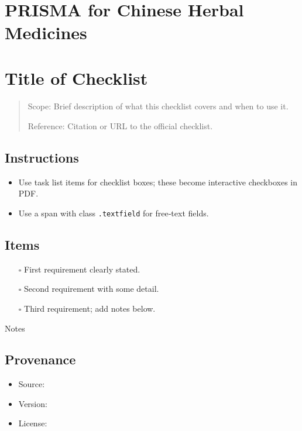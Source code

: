 \documentclass[11pt]{article}
\def\tightlist{}
\begin{document}
\begin{center}
{\LARGE }\\[4pt]
\normalsize 
\end{center}
\vspace{1em}

\begin{Form}

\section{PRISMA for Chinese Herbal
Medicines}\label{prisma-for-chinese-herbal-medicines}

\section{Title of Checklist}\label{title-of-checklist}

\begin{quote}
Scope: Brief description of what this checklist covers and when to use
it.

Reference: Citation or URL to the official checklist.
\end{quote}

\subsection{Instructions}\label{instructions}

\begin{itemize}
\tightlist
\item
  Use task list items for checklist boxes; these become interactive
  checkboxes in PDF.
\item
  Use a span with class \texttt{.textfield} for free‑text fields.
\end{itemize}

\subsection{Items}\label{items}

\begin{itemize}
\tightlist
\item[$\square$]
  First requirement clearly stated.
\item[$\square$]
  Second requirement with some detail.
\item[$\square$]
  Third requirement; add notes below.
\end{itemize}

{Notes}

\subsection{Provenance}\label{provenance}

\begin{itemize}
\tightlist
\item
  Source:
\item
  Version:
\item
  License:
\end{itemize}

\end{Form}
\end{document}
